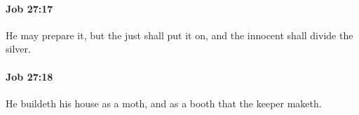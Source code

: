 		\paragraph{Job 27:17} %
			\label{JOB-27-17}

			He may prepare it, but the just shall put it on, and the innocent shall divide the silver.


		\paragraph{Job 27:18} %
			\label{JOB-27-18}

			He buildeth his house as a moth, and as a booth that the keeper maketh.


